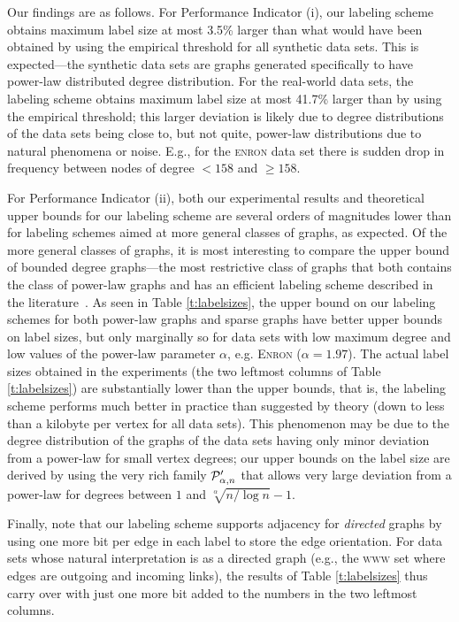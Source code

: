 Our findings are as follows. For Performance Indicator (i), our labeling scheme obtains maximum label size at most 3.5\% larger than what would have been obtained by using the empirical threshold for all synthetic data sets.
This is expected---the synthetic data sets are graphs generated specifically to have power-law distributed degree distribution. For the real-world data sets, the labeling scheme
obtains maximum label size at most 41.7\% larger than by using the empirical threshold; this larger deviation is likely due to degree distributions of the data sets being close to, but not quite,
power-law distributions due to natural phenomena or noise. E.g., for the \textsc{enron} data set there is sudden drop in frequency between nodes of degree $< 158$ and $\geq 158$.

For Performance Indicator (ii), both our experimental results and theoretical upper bounds for our labeling scheme are several orders of magnitudes lower than for labeling schemes aimed at more general classes of graphs, as expected. Of the more general classes of graphs, it is most interesting to compare the upper bound of bounded degree graphs---the most restrictive class of graphs that both contains the class of power-law graphs and has an efficient labeling scheme described in the literature~\cite{adjiashvili2014labeling}. As seen in Table \ref{t:labelsizes}, the upper bound on our labeling schemes for both power-law graphs and sparse graphs have better upper bounds on label sizes, but only marginally so for data sets with low maximum degree and low values of the power-law parameter $\alpha$, e.g. \textsc{Enron} ($\alpha = 1.97$). 
The actual label sizes obtained in the experiments (the two leftmost columns of Table \ref{t:labelsizes}) are substantially lower than the upper bounds, that is,
the labeling scheme performs much better in practice than suggested by theory (down to less than a kilobyte per vertex for all data sets). 
This phenomenon may be due to the degree distribution of the graphs of the data sets having only minor deviation from a power-law for small vertex degrees; our upper bounds on the label size are derived by using the very rich family $ \mathcal{P}'_{\alpha,n}$ that allows very large deviation from a power-law for degrees between $1$ and $\sqrt[\alpha]{n/\log n} - 1$.

Finally, note that our labeling scheme supports adjacency for \emph{directed} graphs by using one more bit per edge in each label to store the edge orientation. For data sets whose natural interpretation is as a directed graph (e.g., the \textsc{www} set where edges are outgoing and incoming links), the results of Table \ref{t:labelsizes} thus carry over with just one more bit
added to the numbers in the two leftmost columns.

